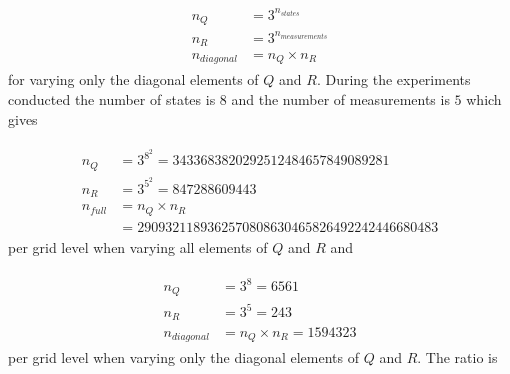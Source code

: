 \begin{align*}
\begin{split}
n_Q &= 3^{n_{states}} \\
n_R &= 3^{n_{measurements}} \\
n_{diagonal} &= n_Q \times n_R
\end{split}
\end{align*}
for varying only the diagonal elements of $Q$ and $R$. During the experiments conducted the number of states is $8$ and the number of measurements is $5$ which gives

\begin{align*}
\begin{split}
n_Q &= 3^{8^2} = 3433683820292512484657849089281 \\
n_R &= 3^{5^2} = 847288609443 \\
n_{full} &= n_Q \times n_R \\
&= 2909321189362570808630465826492242446680483
\end{split}
\end{align*}
per grid level when varying all elements of $Q$ and $R$ and

\begin{align*}
\begin{split}
n_Q &= 3^8 = 6561 \\
n_R &= 3^5 = 243 \\
n_{diagonal} &= n_Q \times n_R = 1594323
\end{split}
\end{align*}
per grid level when varying only the diagonal elements of $Q$ and $R$. The ratio is

